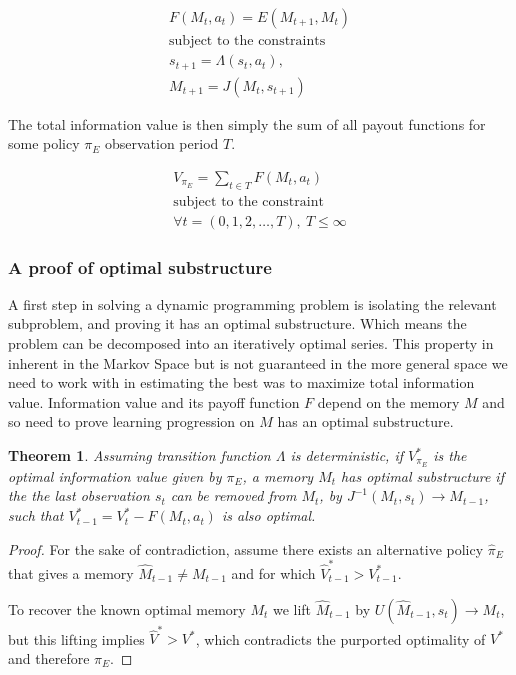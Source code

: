 \documentclass[9pt,twocolumn,twoside]{pnas-new}
\newtheorem{theorem}{Theorem}
\begin{document}
\begin{equation}
    \begin{split} \label{eq:V}
    F(M_t, a_t) = E(M_{t+1}, M_{t})\\
    \text{subject to the constraints} \\
    s_{t+1} = \Lambda(s_t, a_t),\\ 
    M_{t+1} = J(M_t, s_{t+1})
    \end{split} 
\end{equation}

The total information value is then simply the sum of all payout functions for some policy $\pi_E$ observation period $T$. 

\begin{equation} \label{eq:V}
    \begin{split}
        V_{\pi_E} = \sum_{t \in T} F(M_t, a_t)\\
        \text{subject to the constraint}\\
        \forall t = (0,1,2,\ldots, T),\ T \leq \infty
    \end{split}
\end{equation}

\subsubsection*{A proof of optimal substructure}
A first step in solving a dynamic programming problem is isolating the relevant subproblem, and proving it has an optimal substructure. Which means the problem can be decomposed into an iteratively optimal series. This property in inherent in the Markov Space %
but is not guaranteed in the more general space we need to work with in estimating the best was to maximize total information value. Information value and its payoff function $F$ depend on the memory $M$ and so need to prove learning progression on $M$ has an optimal substructure.

\begin{theorem} \label{theorem:opt_sub}
    Assuming transition function $\Lambda$ is deterministic, if $V^*_{\pi_E}$ is the optimal information value given by $\pi_E$, a memory $M_t$ has optimal substructure if the the last observation $s_t$ can be removed from $M_t$, by $J^{-1}(M_t, s_t) \rightarrow M_{t-1}$, such that $V^*_{t-1} = V^*_t - F(M_t, a_t)$ is also optimal. 
\end{theorem}
\begin{proof}
    For the sake of contradiction, assume there exists an alternative policy $\hat \pi_E$ that gives a memory $\hat M_{t-1} \neq M_{t-1}$ and for which $\hat V^*_{t-1} > V^*_{t-1}$. 

    To recover the known optimal memory $M_t$ we lift $\hat M_{t-1}$ by $U(\hat M_{t-1}, s_t) \rightarrow M_t$, but this lifting implies $\hat V^* > V^*$, which contradicts the purported optimality of $V^*$ and therefore $\pi_E$.
\end{proof}
\end{document}

